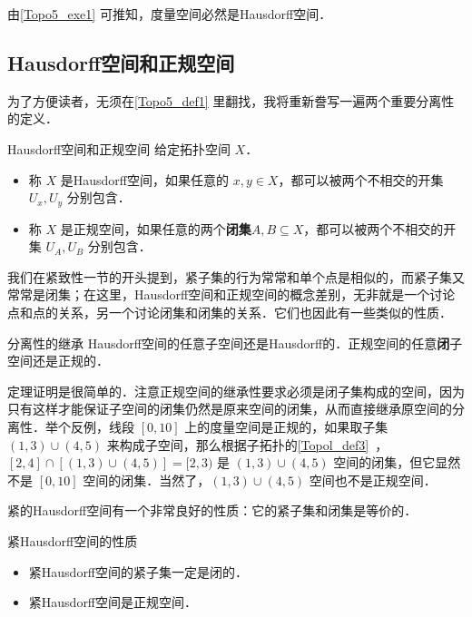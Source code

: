 \begin{corollary}{}
由\autoref{Topo5_exe1} 可推知，度量空间必然是Hausdorff空间．
\end{corollary}

\subsection{Hausdorff空间和正规空间}

为了方便读者，无须在\autoref{Topo5_def1} 里翻找，我将重新誊写一遍两个重要分离性的定义．

\begin{definition}{Hausdorff空间和正规空间}
给定拓扑空间 $X$．
\begin{itemize}
\item 称 $X$ 是Hausdorff空间，如果任意的 $x,y\in X$，都可以被两个不相交的开集 $U_x, U_y$ 分别包含．
\item 称 $X$ 是正规空间，如果任意的两个\textbf{闭集}$A, B\subseteq X$，都可以被两个不相交的开集 $U_A, U_B$ 分别包含．
\end{itemize}
\end{definition}

我们在紧致性一节的开头提到，紧子集的行为常常和单个点是相似的，而紧子集又常常是闭集；在这里，Hausdorff空间和正规空间的概念差别，无非就是一个讨论点和点的关系，另一个讨论闭集和闭集的关系．它们也因此有一些类似的性质．

\begin{theorem}{分离性的继承}
Hausdorff空间的任意子空间还是Hausdorff的．正规空间的任意\textbf{闭}子空间还是正规的．
\end{theorem}

定理证明是很简单的．注意正规空间的继承性要求必须是闭子集构成的空间，因为只有这样才能保证子空间的闭集仍然是原来空间的闭集，从而直接继承原空间的分离性．举个反例，线段 $[0,10]$ 上的度量空间是正规的，如果取子集 $(1,3)\cup(4,5)$ 来构成子空间，那么根据子拓扑的\autoref{Topol_def3}~，$[2,4]\cap[(1,3)\cup(4,5)]=[2,3)$ 是 $(1,3)\cup(4,5)$ 空间的闭集，但它显然不是 $[0,10]$ 空间的闭集．当然了，$(1,3)\cup(4,5)$ 空间也不是正规空间．

紧的Hausdorff空间有一个非常良好的性质：它的紧子集和闭集是等价的．
\begin{theorem}{紧Hausdorff空间的性质}
\begin{itemize}
\item 紧Hausdorff空间的紧子集一定是闭的．
\item 紧Hausdorff空间是正规空间．

\end{itemize}
\end{theorem}

